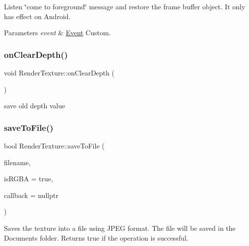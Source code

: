 Listen \char`\"{}come to foreground\char`\"{} message and restore the frame buffer object. It only has effect on Android.


\begin{DoxyParams}{Parameters}
{\em event} & \hyperlink{classEvent}{Event} Custom. \\
\hline
\end{DoxyParams}
\mbox{\label{classRenderTexture_ac94c214b8570de378cfcc9951e853e98}} 
\subsubsection{\texorpdfstring{on\+Clear\+Depth()}{onClearDepth()}}
{\footnotesize\ttfamily void Render\+Texture\+::on\+Clear\+Depth (\begin{DoxyParamCaption}{ }\end{DoxyParamCaption})\hspace{0.3cm}{\ttfamily [protected]}}

save old depth value \mbox{\label{classRenderTexture_af825fb3cddf5bae91ee9e89d31c2b5d7}} 
\subsubsection{\texorpdfstring{save\+To\+File()}{saveToFile()}\hspace{0.1cm}{\footnotesize\ttfamily [1/4]}}
{\footnotesize\ttfamily bool Render\+Texture\+::save\+To\+File (\begin{DoxyParamCaption}\item[{const std\+::string \&}]{filename,  }\item[{bool}]{is\+R\+G\+BA = {\ttfamily true},  }\item[{std\+::function$<$ void(\hyperlink{classRenderTexture}{Render\+Texture} $\ast$, const std\+::string \&)$>$}]{callback = {\ttfamily nullptr} }\end{DoxyParamCaption})}

Saves the texture into a file using J\+P\+EG format. The file will be saved in the Documents folder. Returns true if the operation is successful.


